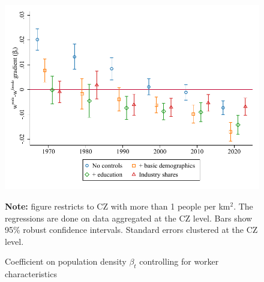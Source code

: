 \begin{figure}[!h]
\centering
\caption{Coefficient on population density $ \beta_t $ controlling for worker characteristics}
\includegraphics[width=.6\textwidth]{../2_analysis/output/figures/with_control_gradients_l_czone_density_full_time}
\par \begin{minipage}[h]{\textwidth}{\tiny\textbf{Note:} figure restricts to CZ with more than 1 people per km$^2$. The regressions are done on data aggregated at the CZ level. Bars show 95\% robust confidence intervals. Standard errors clustered at the CZ level.}\end{minipage}
\end{figure}
